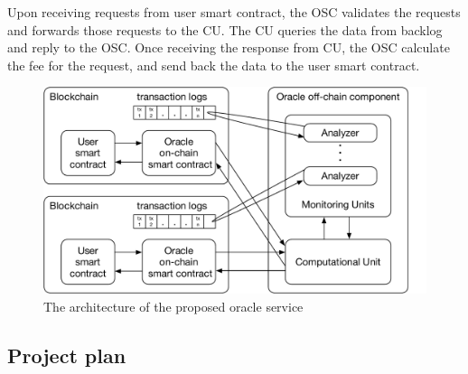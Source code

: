 Upon receiving requests from user smart contract, the OSC validates the requests
and forwards those requests to the CU. The CU queries the data from backlog and
reply to the OSC. Once receiving the response from CU, the OSC calculate the fee
for the request, and send back the data to the user smart contract.

\begin{figure}[ht!]
\begin{minipage}[b]{1\linewidth}
\centering
      \includegraphics[width=0.6\linewidth]{figures/architecture}
\end{minipage}
\caption{The architecture of the proposed oracle service}
\label{fig:architecture}
\end{figure}


  
\subsection{Project plan}

